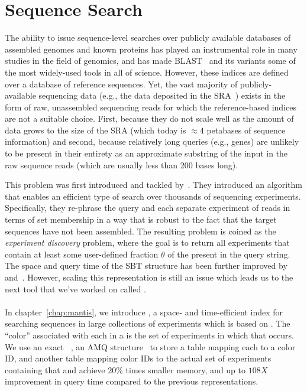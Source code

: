 \section{Sequence Search}
\label{subsec:seqsearch}
The ability to issue sequence-level searches over publicly available databases
of assembled genomes and known proteins has played an instrumental role in many
studies in the field of genomics, and has made BLAST~\citep{Altschul1990BLAST}
and its variants some of the most widely-used tools in all of science.
However, these indices are defined over a database of reference sequences.
Yet, the vast majority of
publicly-available sequencing data (e.g., the data deposited in the
SRA~\citep{Kodama2011sequence}) exists in the form of raw, unassembled
sequencing reads for which the reference-based indices are not
a suitable choice. First, because they do not
scale well as the amount of data grows to the size of the  SRA (which today is
$\approx 4$ petabases of sequence information) and second, because relatively long queries (e.g.,
genes) are unlikely to be present in their entirety as an approximate substring
of the input in the raw sequence reads (which are usually less than 200 bases long).

This problem was first introduced and tackled by~\citet{Solomon2016Fast}.
They introduced an algorithm that enables an
efficient type of search over thousands of sequencing experiments.
Specifically, they re-phrase the query and each separate experiment of reads
in terms of \kmer set membership in a way
that is robust to the fact that the target sequences have not been assembled.
The resulting problem is coined as the \emph{experiment discovery} problem,
where the goal is to return all experiments that contain at least some
user-defined fraction $\theta$ of the \kmers present in the query string.
The space and query time of the SBT structure has been further improved
by~\cite{Solomon2017Improved} and~\cite{Sun2017Allsome}.
However, scaling this representation is still an issue
which leads us to the next tool that we've worked on called \mantis.

\paragraph*{}
In chapter~\ref{chap:mantis}, we introduce \mantis,
a space- and time-efficient index for searching sequences in large
collections of experiments which is based on \cdbgs.
The ``color'' associated with each \kmer
in a \cdbg is the set of experiments in which that \kmer occurs. We
use an exact \cqf~\cite{PandeyBeJo17}, an AMQ structure~\cite{}
to store a table mapping each \kmer to a color ID,
and another table mapping color IDs to the actual set of experiments
containing that \kmer and achieve 20$\%$ times smaller memory,
and up to $108X$ improvement in query time compared to the previous representations.

